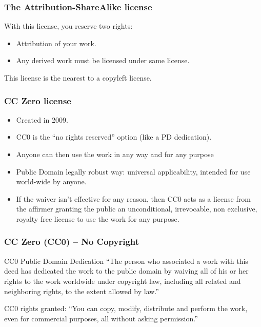
\begin{frame}
\frametitle{The Attribution-ShareAlike license}

With this license, you reserve two rights:

\begin{itemize}
\item Attribution of your work.
\item Any derived work must be licensed under same license.
\end{itemize}

This license is the nearest to a copyleft license. 

\end{frame}


\begin{frame}
\frametitle{CC Zero license}


\begin{itemize}
\item Created in 2009.
\item CC0 is the ``no rights reserved'' option (like a PD dedication).
\item Anyone can then use the work in any way and for any purpose
\item Public Domain legally robust way: universal applicability, intended for use world-wide by anyone.
\item If the waiver isn't effective for any reason, then CC0 acts as a license from the affirmer granting the public an unconditional, irrevocable, non exclusive, royalty free license to use the work for any purpose. 
\end{itemize}


\end{frame}


\begin{frame}
\frametitle{CC Zero (CC0) -- No Copyright}

\begin{block}{CC0 Public Domain Dedication}
``The person who associated a work with this deed has dedicated the work to the public domain by waiving all of his or her rights to the work worldwide under copyright law, including all related and neighboring rights, to the extent allowed by law.''
\end{block}

\medskip

\small
CC0 rights granted: ``\alert{You can copy, modify, distribute and perform the work, even for commercial purposes, all without asking permission.}''

\end{frame}

